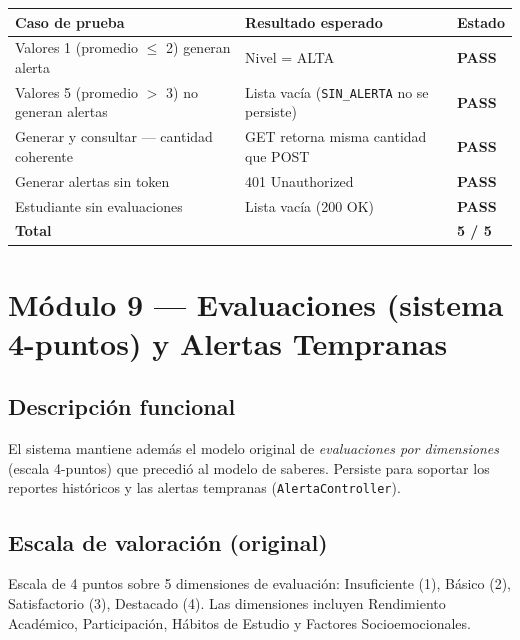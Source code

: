 \documentclass[11pt,a4paper,oneside]{article}
\newcommand{\code}[1]{\texttt{\small #1}}
\newcommand{\pass}{\textbf{\color{ataraVerde}PASS}}
\begin{document}
\begin{table}[h]\centering\small\renewcommand{\arraystretch}{1.15}
\begin{tabular}{@{}p{6.5cm} p{5.5cm} p{1.4cm}@{}}
\toprule
\textbf{Caso de prueba} & \textbf{Resultado esperado} & \textbf{Estado} \\
\midrule
Valores 1 (promedio $\leq$ 2) generan alerta       & Nivel = ALTA                              & \pass \\
Valores 5 (promedio $>$ 3) no generan alertas      & Lista vacía (\code{SIN\_ALERTA} no se persiste) & \pass \\
Generar y consultar — cantidad coherente           & GET retorna misma cantidad que POST       & \pass \\
Generar alertas sin token                          & 401 Unauthorized                          & \pass \\
Estudiante sin evaluaciones                        & Lista vacía (200 OK)                      & \pass \\
\midrule
\textbf{Total}                                     &                                           & \textbf{5 / 5} \\
\bottomrule
\end{tabular}
\end{table}

\section{Módulo 9 — Evaluaciones (sistema 4-puntos) y Alertas Tempranas}

\subsection{Descripción funcional}

El sistema mantiene además el modelo original de \emph{evaluaciones por dimensiones} (escala
4-puntos) que precedió al modelo de saberes. Persiste para soportar los reportes históricos y
las alertas tempranas (\code{AlertaController}).

\subsection{Escala de valoración (original)}

Escala de 4 puntos sobre 5 dimensiones de evaluación: Insuficiente (1), Básico (2),
Satisfactorio (3), Destacado (4). Las dimensiones incluyen Rendimiento Académico,
Participación, Hábitos de Estudio y Factores Socioemocionales.
\end{document}
